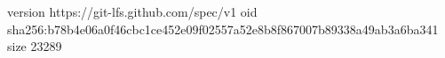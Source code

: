 version https://git-lfs.github.com/spec/v1
oid sha256:b78b4e06a0f46cbc1ce452e09f02557a52e8b8f867007b89338a49ab3a6ba341
size 23289
